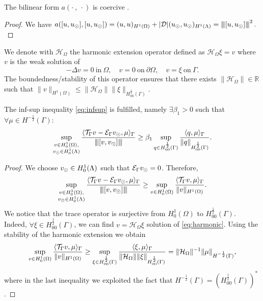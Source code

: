 \begin{lemma}\label{lemma:prob1_coercivity}
The bilinear form $a(\cdot \ , \ \cdot)$ is coercive .
\end{lemma}
\begin{proof}
We have
$a([u,\ud], [u,\ud])= (u,u)_{H^1(\Omega)} + |{\cal D}|(\ud,\ud)_{H^1(\Lambda)} = \vertiii{[u,\ud]}^2\,.$
\end{proof}

We denote with $\mathcal{H}_\Omega$ the harmonic extension operator defined as $\mathcal{H}_\Omega \xi = v$ where $v$ is the weak solution of
\begin{equation}\label{eq:harmonic}
-\Delta v=0 \ \text{in} \ \Omega,
\quad
v=0 \ \text{on} \ \partial \Omega,
\quad
v=\xi \ \text{on} \ \Gamma. 
\end{equation}
The boundedness/stability of this operator ensures that there exists $\| \mathcal{H}_\Omega \| \in \mathbb{R}$ such that
$\|v \|_{H^1(\Omega)}\leq \|\mathcal{H}_\Omega\| \|\xi \|_{H^{\frac 12}_{00}(\Gamma)}$. 

\begin{lemma}
The inf-sup inequality \eqref{eq:infsup} is fulfilled, namely $\exists \beta_1 >0$ such that $\forall \mu \in H^{-\frac 12}(\Gamma)$:
\begin{equation*}
\sup _{\substack{v\in H^1_0(\Omega),\\ v_{\odot} \in H^1_0(\Lambda)}} \frac{ \langle {\mathcal{T}_\Gamma} v  - \mathcal{E}_\Gamma v_{\odot}, \mu \rangle_\Gamma}{{\left\vert\kern-0.25ex\left\vert\kern-0.25ex\left\vert [v, v_{\odot}] \right\vert\kern-0.25ex\right\vert\kern-0.25ex\right\vert}}
\geq \beta_1 \sup_{q\in H^{\frac 12}_{00}(\Gamma)}\frac{\langle q, \mu\rangle_{\Gamma}}{\|q\|_{H^{\frac 12}_{00}(\Gamma)}}.
\end{equation*}
\end{lemma} 
\begin{proof}
We choose $v_{\odot} \in H^1_0(\Lambda)$ such that $\mathcal{E}_\Gamma v_{\odot} =0$. Therefore,
\begin{equation*}
\sup _{\substack{v\in H^1_0(\Omega),\\ v_{\odot} \in H^1_0(\Lambda)}} \frac{ \langle {\mathcal{T}_\Gamma} v  - \mathcal{E}_\Gamma v_{\odot}, \mu\rangle_\Gamma}{{\left\vert\kern-0.25ex\left\vert\kern-0.25ex\left\vert [v, v_{\odot}] \right\vert\kern-0.25ex\right\vert\kern-0.25ex\right\vert}} 
\geq \sup _{v\in H^1_0(\Omega)} \frac{ \langle {\mathcal{T}_\Gamma} v, \mu \rangle_\Gamma}{\|v\|_{H^1(\Omega)}}.
\end{equation*}
We notice that the trace operator is surjective from $H^1_0(\Omega)$ to $H^{\frac12}_{00}(\Gamma)$. Indeed, $\forall \xi \in H^{\frac 12}_{00}(\Gamma)$, 
we  can find $v=\mathcal{H}_\Omega \xi$ solution of \eqref{eq:harmonic}. Using the stability of the harmonic extension we obtain
\begin{equation}\label{infsup_traceop}
\sup _{v\in H^1_0(\Omega)} \frac{ \langle \trace v, \mu \rangle_\Gamma}{\|v\|_{H^1(\Omega)}}
\geq  \sup _{\xi \in H^{\frac 12}_{00}(\Gamma )} \frac{ \langle \xi , \mu \rangle_\Gamma}{\|\mathcal{H}_\Omega\| \|\xi\|_{H^{\frac 12}_{00}(\Gamma)}}
= \|\mathcal{H}_\Omega\|^{-1} \|\mu\|_{H^{-\frac 12}(\Gamma)},
\end{equation}
where in the last inequality we exploited the fact that $H^{-\frac 12}(\Gamma)=(H^{\frac 12 }_{00}(\Gamma))^*$. 
\end{proof}


